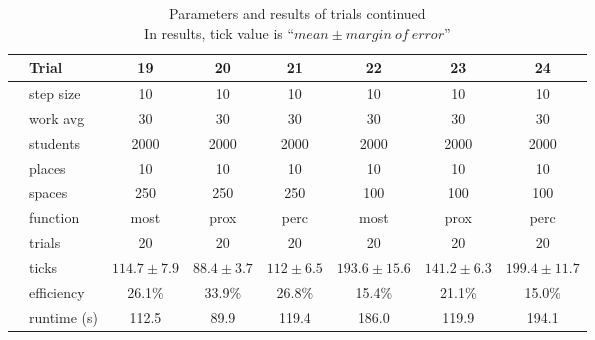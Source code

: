 \documentclass[11pt]{article} %
\begin{document}
\begin{table}[]
\footnotesize
\centering
\begin{tabular}{l|l|ccc|ccc}
 & Trial & 19 & 20 & 21 & 22 & 23 & 24  \\ \hline
  \parbox[t]{2mm}{} 
 & step size 	& 10  			& 10  			& 10 			& 10 					& 10 				& 10  \\
 & work avg 	& 30 			&  30 			& 30			& 30 					& 30 				& 30 \\
 & students 	& 2000 			& 2000 			& 2000 			& 2000 					& 2000 				& 2000 \\
 & places 		& 10 			& 10 			& 10 			& 10 					& 10 				& 10 \\
 & spaces 		& 250 			& 250 			& 250 			& 100 					& 100 				& 100 \\
 & function 	& most 			& prox 			& perc 			& most 					& prox 				& perc \\
 & trials 		& 20 			& 20 			& 20 			& 20 					& 20 				& 20 \\ \hline
\parbox[t]{2mm}{} 
 & ticks 		& $114.7\pm 7.9$ 	& $88.4\pm 3.7 $ 	& $ 112\pm 6.5 $	& $193.6\pm 15.6 $	& $141.2\pm 6.3 $	& $199.4\pm 11.7 $ \\
 & efficiency 	& 26.1\%			& 33.9\%		& 26.8\%			& 15.4\%			& 21.1\%			& 15.0\% \\
 & runtime (s) 	& 112.5			& 89.9			& 119.4			& 186.0			& 119.9			& 194.1
\end{tabular}
\caption{Parameters and results of trials continued \\ \footnotesize In results, tick value is ``$mean \pm margin \: of \: error$''}
\end{table}
\end{document}
